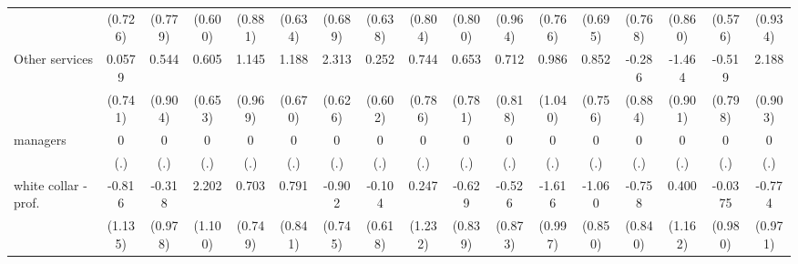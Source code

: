{\begin{tabular}{l*{16}{c}}
                    &     (0.726)         &     (0.779)         &     (0.600)         &     (0.881)         &     (0.634)         &     (0.689)         &     (0.638)         &     (0.804)         &     (0.800)         &     (0.964)         &     (0.766)         &     (0.695)         &     (0.768)         &     (0.860)         &     (0.576)         &     (0.934)         \\
[1em]
Other services      &      0.0579         &       0.544         &       0.605         &       1.145         &       1.188         &       2.313\sym{***}&       0.252         &       0.744         &       0.653         &       0.712         &       0.986         &       0.852         &      -0.286         &      -1.464         &      -0.519         &       2.188\sym{*}  \\
                    &     (0.741)         &     (0.904)         &     (0.653)         &     (0.969)         &     (0.670)         &     (0.626)         &     (0.602)         &     (0.786)         &     (0.781)         &     (0.818)         &     (1.040)         &     (0.756)         &     (0.884)         &     (0.901)         &     (0.798)         &     (0.903)         \\
[1em]
managers            &           0         &           0         &           0         &           0         &           0         &           0         &           0         &           0         &           0         &           0         &           0         &           0         &           0         &           0         &           0         &           0         \\
                    &         (.)         &         (.)         &         (.)         &         (.)         &         (.)         &         (.)         &         (.)         &         (.)         &         (.)         &         (.)         &         (.)         &         (.)         &         (.)         &         (.)         &         (.)         &         (.)         \\
[1em]
white collar - prof.&      -0.816         &      -0.318         &       2.202\sym{*}  &       0.703         &       0.791         &      -0.902         &      -0.104         &       0.247         &      -0.629         &      -0.526         &      -1.616         &      -1.060         &      -0.758         &       0.400         &     -0.0375         &      -0.774         \\
                    &     (1.135)         &     (0.978)         &     (1.100)         &     (0.749)         &     (0.841)         &     (0.745)         &     (0.618)         &     (1.232)         &     (0.839)         &     (0.873)         &     (0.997)         &     (0.850)         &     (0.840)         &     (1.162)         &     (0.980)         &     (0.971)         \\

\end{tabular}}
